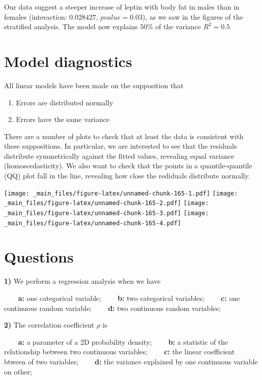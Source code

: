 \documentclass[
]{book}
\begin{document}
Our data suggest a steeper increase of leptin with body fat in males than in females (interaction: \(0.028427\), \(pvalue=0.03\)), as we saw in the figures of the stratified analysis. The model now explains \(50\%\) of the variance \(R^2=0.5\)

\hypertarget{model-diagnostics}{%
\section{Model diagnostics}\label{model-diagnostics}}

All linear models have been made on the supposition that

\begin{enumerate}
\def\labelenumi{\arabic{enumi}.}
\item
  Errors are distributed normally
\item
  Errors have the same variance
\end{enumerate}

There are a number of plots to check that at least the data is consistent with these suppositions. In particular, we are interested to see that the residuals distribute symmetrically against the fitted values, revealing equal variance (homoscedasticity). We also want to check that the points in a quantile-quantile (QQ) plot fall in the line, revealing how close the rediduals distribute normally.

\texttt{[image: \_main\_files/figure-latex/unnamed-chunk-165-1.pdf]} \texttt{[image: \_main\_files/figure-latex/unnamed-chunk-165-2.pdf]} \texttt{[image: \_main\_files/figure-latex/unnamed-chunk-165-3.pdf]} \texttt{[image: \_main\_files/figure-latex/unnamed-chunk-165-4.pdf]}

\hypertarget{questions-14}{%
\section{Questions}\label{questions-14}}

\textbf{1)} We perform a regression analysis when we have

\textbf{\(\qquad\)a:} one categorical variable;
\textbf{\(\qquad\)b:} two categorical variables;
\textbf{\(\qquad\)c:} one continuous random variable;
\textbf{\(\qquad\)d:} two continuous random variables;

\textbf{2)} The correlation coefficient \(\rho\) is

\textbf{\(\qquad\)a:} a parameter of a 2D probability density;
\textbf{\(\qquad\)b:} a statistic of the relationship between two continuous variables;
\textbf{\(\qquad\)c:} the linear coefficient btween of two variables;
\textbf{\(\qquad\)d:} the variance explained by one continuous variable on other;
\end{document}
